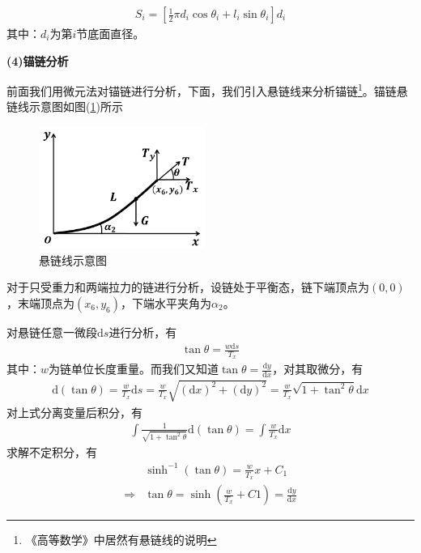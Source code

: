             \begin{align*}
            S_i = \left[ \frac{1}{2}\pi d_i\cos\theta_i+l_i\sin\theta_i \right]d_i
            \end{align*}
            其中：$d_i$为第$i$节底面直径。
            \par
            \textbf{(4)锚链分析}
            \par
            前面我们用微元法对锚链进行分析，下面，我们引入悬链线来分析锚链\footnote{《高等数学》中居然有悬链线的说明}。锚链悬链线示意图如图(\ref{悬链线示意图})所示
            \begin{figure}[H]
            \centering
            \includegraphics[height=4cm]{images/Catenary_line.jpg}
            \caption{悬链线示意图}
            \label{悬链线示意图}
            \end{figure}
            对于只受重力和两端拉力的链进行分析，设链处于平衡态，链下端顶点为$(0,0)$，末端顶点为$(x_6,y_6)$，下端水平夹角为$\alpha_2$。
            \par
            对悬链任意一微段$\mathrm{d}s$进行分析，有
            \begin{align*}
            \tan \theta = \frac{w\mathrm{d}s}{T_x}
            \end{align*}
            其中：$w$为链单位长度重量。而我们又知道$\tan\theta = \frac{\mathrm{d}y}{\mathrm{d}x}$，对其取微分，有
            \begin{align*}
            \mathrm{d}(\tan\theta) = \frac{w}{T_x}\mathrm{d}s = \frac{w}{T_x}\sqrt{(\mathrm{d}x)^2+(\mathrm{d}y)^2} = \frac{w}{T_x}\sqrt{1+\tan^2\theta}\mathrm{d}x
            \end{align*}
            对上式分离变量后积分，有
            \begin{align*}
            \int \frac{1}{\sqrt{1+\tan^2\theta}}\mathrm{d}(\tan\theta) = \int
            \frac{w}{T_x}\mathrm{d}x
            \end{align*}
            求解不定积分，有
            \begin{align*}
            & \sinh^{-1}(\tan\theta) = \frac{w}{T_x}x+C_1\\
            \Rightarrow{}& \tan\theta =  \sinh(\frac{w}{T_x}+C1) =\frac{\mathrm{d}y}{\mathrm{d}x}
            \end{align*}
